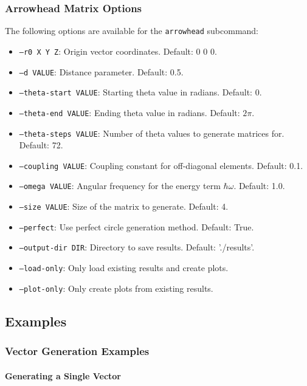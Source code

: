 \subsubsection{Arrowhead Matrix Options}

The following options are available for the \texttt{arrowhead} subcommand:

\begin{itemize}
    \item \texttt{--r0 X Y Z}: Origin vector coordinates. Default: 0 0 0.
    \item \texttt{--d VALUE}: Distance parameter. Default: 0.5.
    \item \texttt{--theta-start VALUE}: Starting theta value in radians. Default: 0.
    \item \texttt{--theta-end VALUE}: Ending theta value in radians. Default: $2\pi$.
    \item \texttt{--theta-steps VALUE}: Number of theta values to generate matrices for. Default: 72.
    \item \texttt{--coupling VALUE}: Coupling constant for off-diagonal elements. Default: 0.1.
    \item \texttt{--omega VALUE}: Angular frequency for the energy term $\hbar\omega$. Default: 1.0.
    \item \texttt{--size VALUE}: Size of the matrix to generate. Default: 4.
    \item \texttt{--perfect}: Use perfect circle generation method. Default: True.
    \item \texttt{--output-dir DIR}: Directory to save results. Default: './results'.
    \item \texttt{--load-only}: Only load existing results and create plots.
    \item \texttt{--plot-only}: Only create plots from existing results.
\end{itemize}



\subsection{Examples}

\subsubsection{Vector Generation Examples}

\paragraph{Generating a Single Vector}

